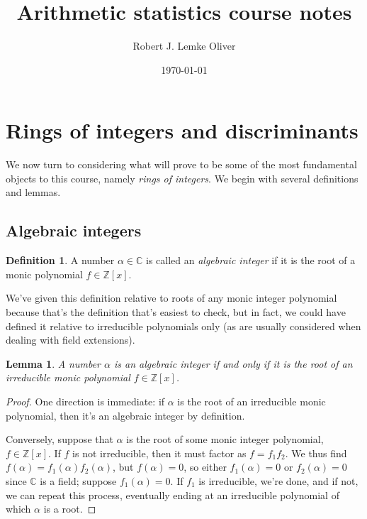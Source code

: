 \documentclass[12pt]{amsart}
\title{Arithmetic statistics course notes}
\author{Robert J. Lemke Oliver}
\date{\today}
\newtheorem{lemma}[theorem]{Lemma}
\theoremstyle{definition} \newtheorem*{notation}{Notation}
\theoremstyle{remark} \newtheorem*{remark}{Remark}
\theoremstyle{remark} \newtheorem*{example}{Example}
\theoremstyle{definition} \newtheorem*{definition}{Definition}
\numberwithin{equation}{section}
\numberwithin{theorem}{section}
\begin{document}
	\maketitle
	
	\setcounter{section}{1}
	
\section{Rings of integers and discriminants}
	
	We now turn to considering what will prove to be some of the most fundamental objects to this course, namely \emph{rings of integers}.  We begin with several definitions and lemmas.
	
	\subsection{Algebraic integers}
	
	\begin{definition}
		A number $\alpha \in \mathbb{C}$ is called an \emph{algebraic integer} if it is the root of a monic polynomial $f \in \mathbb{Z}[x]$.
	\end{definition}
	
	We've given this definition relative to roots of any monic integer polynomial because that's the definition that's easiest to check, but in fact, we could have defined it relative to irreducible polynomials only (as are usually considered when dealing with field extensions).
	
	\begin{lemma}
		A number $\alpha$ is an algebraic integer if and only if it is the root of an irreducible monic polynomial $f \in \mathbb{Z}[x]$.
	\end{lemma}
	\begin{proof}
		One direction is immediate: if $\alpha$ is the root of an irreducible monic polynomial, then it's an algebraic integer by definition.
		
		Conversely, suppose that $\alpha$ is the root of some monic integer polynomial, $f \in \mathbb{Z}[x]$.  If $f$ is not irreducible, then it must factor as $f = f_1 f_2$.  We thus find $f(\alpha) = f_1(\alpha) f_2(\alpha)$, but $f(\alpha)=0$, so either $f_1(\alpha)=0$ or $f_2(\alpha)=0$ since $\mathbb{C}$ is a field; suppose $f_1(\alpha)=0$.  If $f_1$ is irreducible, we're done, and if not, we can repeat this process, eventually ending at an irreducible polynomial of which $\alpha$ is a root.
	\end{proof}
	
\end{document}
